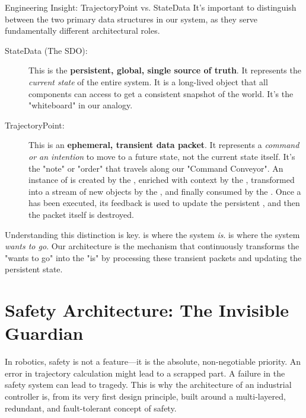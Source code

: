 \begin{tipbox}{Engineering Insight: TrajectoryPoint vs. StateData}
It's important to distinguish between the two primary data structures in our system, as they serve fundamentally different architectural roles.
\begin{description}
    \item[StateData (The SDO):] This is the \textbf{persistent, global, single source of truth}. It represents the \textit{current state} of the entire system. It is a long-lived object that all components can access to get a consistent snapshot of the world. It's the "whiteboard" in our analogy.
    \item[TrajectoryPoint:] This is an \textbf{ephemeral, transient data packet}. It represents a \textit{command or an intention} to move to a future state, not the current state itself. It's the "note" or "order" that travels along our "Command Conveyor". An instance of  is created by the , enriched with context by the , transformed into a stream of new  objects by the , and finally consumed by the . Once a  has been executed, its feedback is used to update the persistent , and then the packet itself is destroyed.
\end{description}
\end{tipbox}

Understanding this distinction is key.  is where the system \textit{is}.  is where the system \textit{wants to go}. Our architecture is the mechanism that continuously transforms the "wants to go" into the "is" by processing these transient packets and updating the persistent state.






\section{Safety Architecture: The Invisible Guardian}
\label{sec:safety_architecture}

In robotics, safety is not a feature—it is the absolute, non-negotiable priority. An error in trajectory calculation might lead to a scrapped part. A failure in the safety system can lead to tragedy. This is why the architecture of an industrial controller is, from its very first design principle, built around a multi-layered, redundant, and fault-tolerant concept of safety.

